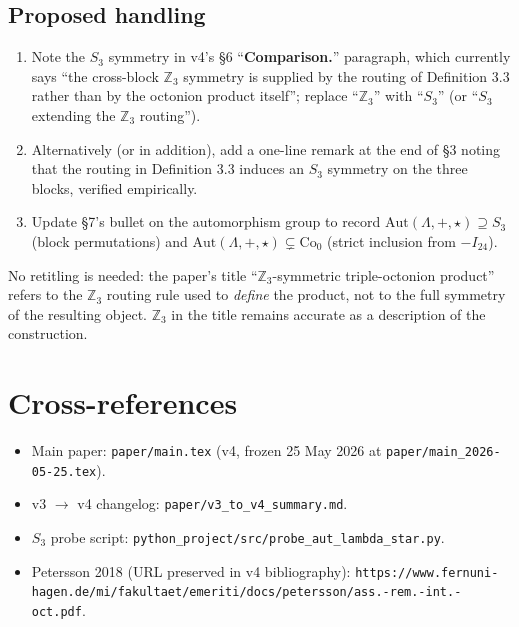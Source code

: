 \documentclass[11pt]{amsart}
\newcommand{\LL}{\Lambda}
\newcommand{\ZZ}{\mathbb{Z}}
\newcommand{\Aut}{\mathrm{Aut}}
\newcommand{\Co}{\mathrm{Co}}
\theoremstyle{remark}
\begin{document}
\subsection*{Proposed handling}

\begin{enumerate}
\item Note the $S_3$ symmetry in v4's \S6 ``\textbf{Comparison.}''
  paragraph, which currently says ``the cross-block $\ZZ_3$
  symmetry is supplied by the routing of Definition 3.3
  rather than by the octonion product itself''; replace ``$\ZZ_3$''
  with ``$S_3$'' (or ``$S_3$ extending the $\ZZ_3$ routing'').
\item Alternatively (or in addition), add a one-line remark at the
  end of \S3 noting that the routing in Definition 3.3 induces an
  $S_3$ symmetry on the three blocks, verified empirically.
\item Update \S7's bullet on the automorphism group to record
  $\Aut(\LL, +, \star) \supseteq S_3$ (block permutations) and
  $\Aut(\LL, +, \star) \subsetneq \Co_0$ (strict inclusion from
  $-I_{24}$).
\end{enumerate}

No retitling is needed: the paper's title ``$\ZZ_3$-symmetric
triple-octonion product'' refers to the $\ZZ_3$ routing rule used
to \emph{define} the product, not to the full symmetry of the
resulting object.  $\ZZ_3$ in the title remains accurate as a
description of the construction.

\section*{Cross-references}

\begin{itemize}
\item Main paper: \texttt{paper/main.tex} (v4, frozen 25 May 2026
  at \texttt{paper/main\_2026-05-25.tex}).
\item v3 $\to$ v4 changelog: \texttt{paper/v3\_to\_v4\_summary.md}.
\item $S_3$ probe script:
  \texttt{python\_project/src/probe\_aut\_lambda\_star.py}.
\item Petersson 2018 (URL preserved in v4 bibliography):
  \texttt{https://www.fernuni-hagen.de/mi/fakultaet/emeriti/docs/petersson/ass.-rem.-int.-oct.pdf}.
\end{itemize}
\end{document}
